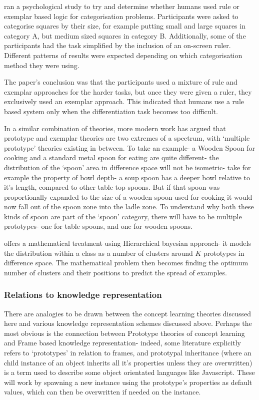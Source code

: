 \documentclass[12pt,MSc,wordcount,twoside]{muthesis}
\begin{document}
    \citealt{rouder2006comparing} ran a psychological study to try and determine whether humans used rule or exemplar based logic for categorisation problems. Participants were asked to categorise squares by their size, for example putting small and large squares in category A, but medium sized squares in category B. Additionally, some of the participants had the task simplified by the inclusion of an on-screen ruler. Different patterns of  results were expected depending on which categorisation method they were using.
    
    The paper's conclusion was that the participants used a mixture of rule and exemplar approaches for the harder tasks, but once they were given a ruler, they exclusively used an exemplar approach. This indicated that humans use a rule based system only when the differentiation task becomes too difficult.

    In a similar combination of theories, more modern work has argued that prototype and exemplar theories are two extremes of a spectrum, with `multiple prototype' theories existing in between. To take an example- a Wooden Spoon for cooking and a standard metal spoon for eating are quite different- the distribution of the `spoon' area in difference space will not be isometric- take for example the property of bowl depth- a soup spoon has a deeper bowl relative to it's length, compared to other table top spoons. But if that spoon was proportionally expanded to the size of a wooden spoon used for cooking it would now fall out of the spoon zone into the ladle zone. To understand why both these kinds of spoon are part of the `spoon' category, there will have to be multiple prototypes- one for table spoons, and one for wooden spoons.

    \citealt{griffiths2007unifying} offers a mathematical treatment using Hierarchical bayesian approach- it models the distribution within a class as a number of clusters around \(K\) prototypes in difference space. The mathematical problem then becomes finding the optimum number of clusters and their positions to predict the spread of examples.

    \subsubsection{Relations to knowledge representation}
    There are analogies to be drawn between the concept learning theories discussed here and various knowledge representation schemes discussed above. Perhaps the most obvious is the connection between Prototype theories of concept learning and Frame based knowledge representation- indeed, some literature explicitly refers to `prototypes' in relation to frames, and prototypal inheritance (where an child instance of an object inherits all it's properties unless they are overwritten) is a term used to describe some object orientated languages like Javascript. These will work by spawning a new instance using the prototype's properties as default values, which can then be overwritten if needed on the instance.
\end{document}
